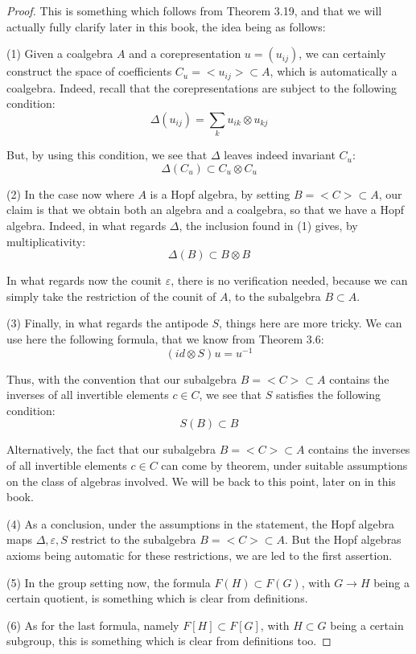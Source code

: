 \documentclass[12pt]{amsbook}
\begin{document}
\begin{proof}
This is something which follows from Theorem 3.19, and that we will actually fully clarify later in this book, the idea being as follows:

\medskip

(1) Given a coalgebra $A$ and a corepresentation $u=(u_{ij})$, we can certainly construct the space of coefficients $C_u=<u_{ij}>\subset A$, which is automatically a coalgebra. Indeed, recall that the corepresentations are subject to the following condition:
$$\Delta(u_{ij})=\sum_ku_{ik}\otimes u_{kj}$$

But, by using this condition, we see that $\Delta$ leaves indeed invariant $C_u$:
$$\Delta(C_u)\subset C_u\otimes C_u$$

(2) In the case now where $A$ is a Hopf algebra, by setting $B=<C>\subset A$, our claim is that we obtain both an algebra and a coalgebra, so that we have a Hopf algebra. Indeed, in what regards $\Delta$, the inclusion found in (1) gives, by multiplicativity:
$$\Delta(B)\subset B\otimes B$$

In what regards now the counit $\varepsilon$, there is no verification needed, because we can simply take the restriction of the counit of $A$, to the subalgebra $B\subset A$. 

\medskip

(3) Finally, in what regards the antipode $S$, things here are more tricky. We can use here the following formula, that we know from Theorem 3.6:
$$(id\otimes S)u=u^{-1}$$

Thus, with the convention that our subalgebra $B=<C>\subset A$ contains the inverses of all invertible elements $c\in C$, we see that $S$ satisfies the following condition:
$$S(B)\subset B$$

Alternatively, the fact that our subalgebra $B=<C>\subset A$ contains the inverses of all invertible elements $c\in C$ can come by theorem, under suitable assumptions on the class of algebras involved. We will be back to this point, later on in this book.

\medskip

(4) As a conclusion, under the assumptions in the statement, the Hopf algebra maps $\Delta,\varepsilon,S$ restrict to the subalgebra $B=<C>\subset A$. But the Hopf algebras axioms being automatic for these restrictions, we are led to the first assertion.

\medskip

(5) In the group setting now, the formula $F(H)\subset F(G)$, with $G\to H$ being a certain quotient, is something which is clear from definitions.

\medskip

(6) As for the last formula, namely $F[H]\subset F[G]$, with $H\subset G$ being a certain subgroup, this is something which is clear from definitions too.
\end{proof}
\end{document}

